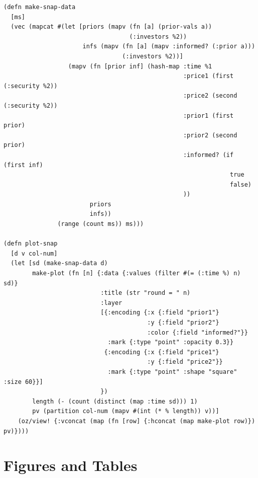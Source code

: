 \documentclass[11pt]{article}
\begin{document}
\begin{lstlisting}
(defn make-snap-data
  [ms]
  (vec (mapcat #(let [priors (mapv (fn [a] (prior-vals a))
                                   (:investors %2))
                      infs (mapv (fn [a] (mapv :informed? (:prior a)))
                                 (:investors %2))]
                  (mapv (fn [prior inf] (hash-map :time %1
                                                  :price1 (first (:security %2)) 
                                                  :price2 (second (:security %2)) 
                                                  :prior1 (first prior)
                                                  :prior2 (second prior)
                                                  :informed? (if (first inf)
                                                               true
                                                               false)
                                                  ))
                        priors
                        infs))
               (range (count ms)) ms)))

(defn plot-snap
  [d v col-num]
  (let [sd (make-snap-data d)
        make-plot (fn [n] {:data {:values (filter #(= (:time %) n) sd)}
                           :title (str "round = " n)
                           :layer
                           [{:encoding {:x {:field "prior1"}
                                        :y {:field "prior2"}
                                        :color {:field "informed?"}}
                             :mark {:type "point" :opacity 0.3}}
                            {:encoding {:x {:field "price1"}
                                        :y {:field "price2"}}
                             :mark {:type "point" :shape "square" :size 60}}]
                           })
        length (- (count (distinct (map :time sd))) 1) 
        pv (partition col-num (mapv #(int (* % length)) v))]
    (oz/view! {:vconcat (map (fn [row] {:hconcat (map make-plot row)}) pv)})))
\end{lstlisting}

\newpage
\printbibliography


\newpage
\section{Figures and Tables}
\label{sec:org75af9cf}
\end{document}
